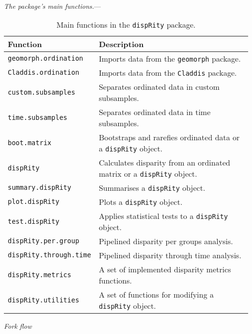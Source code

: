 \documentclass[12pt,letterpaper]{article}
\renewcommand{\subsection}[1]{%
\bigskip
\begin{center}
\begin{large}
\normalfont\itshape #1
\end{large}
\end{center}}
\renewcommand{\subsubsection}[1]{%
\vspace{2ex}
\noindent
\textit{#1.}---}
\begin{document}
\subsubsection{The package's main functions}

\begin{table}
    \begin{tabular}{ll}
        \hline
        Function & Description \\ 
        \hline
        \texttt{geomorph.ordination} & Imports data from the \texttt{geomorph} package. \\
        \texttt{Claddis.ordination} & Imports data from the \texttt{Claddis} package. \\
        \texttt{custom.subsamples} & Separates ordinated data in custom subsamples. \\
        \texttt{time.subsamples} & Separates ordinated data in time subsamples. \\
        \texttt{boot.matrix} & Bootstraps and rarefies ordinated data or a \texttt{dispRity} object. \\
        \texttt{dispRity} & Calculates disparity from an ordinated matrix or a \texttt{dispRity} object. \\
        \texttt{summary.dispRity} & Summarises a \texttt{dispRity} object. \\
        \texttt{plot.dispRity} & Plots a \texttt{dispRity} object. \\
        \texttt{test.dispRity} & Applies statistical tests to a \texttt{dispRity} object.\\
        \texttt{dispRity.per.group} & Pipelined disparity per groups analysis. \\
        \texttt{dispRity.through.time} & Pipelined disparity through time analysis. \\
        \texttt{dispRity.metrics} & A set of implemented disparity metrics functions.\\
        \texttt{dispRity.utilities} & A set of functions for modifying a \texttt{dispRity} object.\\
        \hline
    \end{tabular}
    \caption{Main functions in the \texttt{dispRity} package.}
\end{table}

\subsection{Fork flow}
\end{document}
